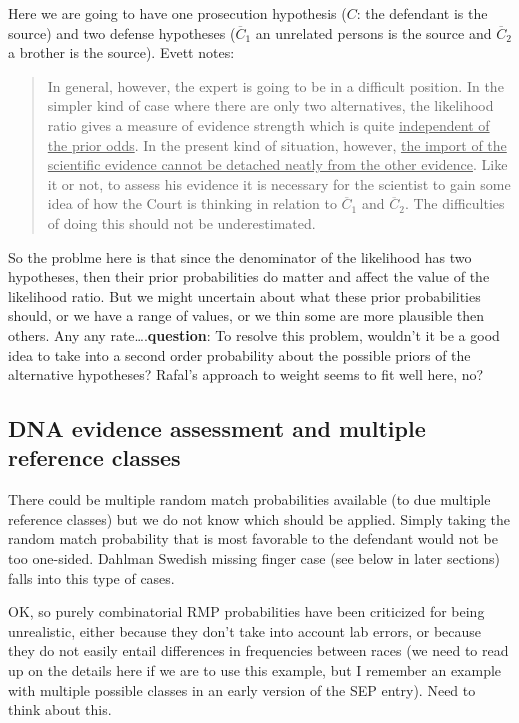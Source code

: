 \documentclass[
  10pt,
  dvipsnames,enabledeprecatedfontcommands]{scrartcl}
\begin{document}
Here we are going to have one prosecution hypothesis (\(C\): the
defendant is the source) and two defense hypotheses (\(\overline{C}_1\)
an unrelated persons is the source and \(\overline{C}_2\) a brother is
the source). Evett notes:

\begin{quote}
In general, however, the expert is going to be in a difficult position. In the
simpler kind of case where there are only two alternatives, the likelihood
ratio gives a measure of evidence strength which is quite \underline{independent of the
prior odds}. In the present kind of situation, however, \underline{the import of the
scientific evidence cannot be detached neatly from the other evidence}. Like
it or not, to assess his evidence it is necessary for the scientist to gain some
idea of how the Court is thinking in relation to $\overline{C}_1$ and $\overline{C}_2$. The difficulties of
doing this should not be underestimated. 
\end{quote}

So the problme here is that since the denominator of the likelihood has
two hypotheses, then their prior probabilities do matter and affect the
value of the likelihood ratio. But we might uncertain about what these
prior probabilities should, or we have a range of values, or we thin
some are more plausible then others. Any any
rate\ldots.\textbf{question}: To resolve this problem, wouldn't it be a
good idea to take into a second order probability about the possible
priors of the alternative hypotheses? Rafal's approach to weight seems
to fit well here, no?

\hypertarget{dna-evidence-assessment-and-multiple-reference-classes}{%
\subsection{DNA evidence assessment and multiple reference
classes}\label{dna-evidence-assessment-and-multiple-reference-classes}}

There could be multiple random match probabilities available (to due
multiple reference classes) but we do not know which should be applied.
Simply taking the random match probability that is most favorable to the
defendant would not be too one-sided. Dahlman Swedish missing finger
case (see below in later sections) falls into this type of cases.

\todo{} OK, so purely combinatorial RMP probabilities have been
criticized for being unrealistic, either because they don't take into
account lab errors, or because they do not easily entail differences in
frequencies between races (we need to read up on the details here if we
are to use this example, but I remember an example with multiple
possible classes in an early version of the SEP entry). Need to think
about this.
\end{document}
